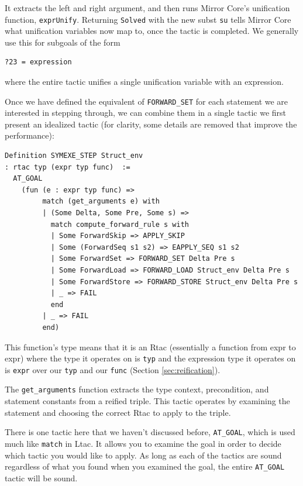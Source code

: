 \documentclass{puthesis}
\begin{document}
It extracts the left and right argument, and then runs Mirror Core's
unification function, \lstinline|exprUnify|. Returning
\lstinline|Solved| with the new subst \lstinline|su| tells Mirror Core
what unification variables now map to, once the tactic is completed.
We generally use this for subgoals of the form 

\begin{lstlisting}
?23 = expression
\end{lstlisting}

where the entire tactic unifies a single unification variable with an expression.

Once we have defined the equivalent of \lstinline|FORWARD_SET| for
each statement we are interested in stepping through, we can combine
them in a single tactic we first present an idealized tactic (for
clarity, some details are removed that improve the performance):

\begin{lstlisting}
Definition SYMEXE_STEP Struct_env
: rtac typ (expr typ func)  :=
  AT_GOAL
    (fun (e : expr typ func) => 
         match (get_arguments e) with
         | (Some Delta, Some Pre, Some s) =>  
           match compute_forward_rule s with
           | Some ForwardSkip => APPLY_SKIP
           | Some (ForwardSeq s1 s2) => EAPPLY_SEQ s1 s2 
           | Some ForwardSet => FORWARD_SET Delta Pre s
           | Some ForwardLoad => FORWARD_LOAD Struct_env Delta Pre s
           | Some ForwardStore => FORWARD_STORE Struct_env Delta Pre s
           | _ => FAIL
           end
         | _ => FAIL
         end)
\end{lstlisting}

This function's type means that it is an Rtac (essentially a function
from expr to expr) where the type it operates on is \lstinline|typ|
and the expression type it operates on is \lstinline|expr| over our
\lstinline|typ| and our \lstinline|func| (Section \ref{sec:reification}).

The \lstinline|get_arguments| function extracts the type context,
precondition, and statement constants from a reified triple. This
tactic operates by examining the statement and choosing the correct
Rtac to apply to the triple. 

There is one tactic here that we haven't discussed before,
\lstinline|AT_GOAL|, which is used much like \lstinline|match| in
Ltac. It allows you to examine the goal in order to decide which
tactic you would like to apply. As long as each of the tactics are
sound regardless of what you found when you examined the goal, the
entire \lstinline|AT_GOAL| tactic will be sound.
\end{document}
